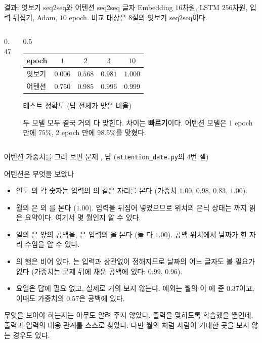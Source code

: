 \documentclass[aspectratio=169,11pt]{beamer}
\begin{document}
\begin{frame}{결과: 엿보기 seq2seq와 어텐션 seq2seq}
글자 Embedding $16$차원, LSTM $256$차원, 입력 뒤집기, Adam, $10$ epoch.
비교 대상은 8절의 엿보기 seq2seq이다.
\vskip1mm
\begin{columns}[c,onlytextwidth]
\begin{column}{0.47\textwidth}
\end{column}
\begin{column}{0.5\textwidth}
\small
\begin{tabular}{@{}lcccc@{}}
\toprule
epoch & $1$ & $2$ & $3$ & $10$ \\
\midrule
엿보기 & $0.006$ & $0.568$ & $0.981$ & $1.000$ \\
어텐션 & $0.750$ & $0.985$ & $0.996$ & $0.999$ \\
\bottomrule
\end{tabular}
\vskip1mm
{\footnotesize 테스트 정확도 (답 전체가 맞은 비율)\par}
\vskip3mm
두 모델 모두 결국 거의 다 맞힌다. 차이는 \textbf{빠르기}이다.
어텐션 모델은 1 epoch 만에 $75\%$, 2 epoch 만에 $98.5\%$를 맞혔다.
\end{column}
\end{columns}
\end{frame}

\begin{frame}{어텐션 가중치를 그려 보면}
문제 , 답  (\texttt{attention\_date.py}의 4번 셀)
\end{frame}

\begin{frame}{어텐션은 무엇을 보았나}
\small
\begin{itemize}
\item 연도 의 각 숫자는 입력의 의 같은 자리를 본다
  (가중치 $1.00$, $0.98$, $0.83$, $1.00$).
\item 월의 은 의 를 본다 ($1.00$).
  입력을 뒤집어 넣었으므로  위치의 은닉 상태는 까지 읽은 요약이다.
  여기서 몇 월인지 알 수 있다.
\item 일의 은  앞의 공백을, 은 입력의 을 본다 (둘 다 $1.00$).
  공백 위치에서 날짜가 한 자리 수임을 알 수 있다.
\item \w{-}의 행은 비어 있다. \w{-}는 입력과 상관없이 정해지므로 날짜의 어느 글자도
  볼 필요가 없다 (가중치는 문제 뒤에 채운 공백에 있다: $0.99$, $0.96$).
\item 요일은 답에 필요 없고, 실제로 거의 보지 않는다.
  예외는 월의 이 에 준 $0.37$이고, 이때도 가중치의 $0.57$은 공백에 있다.
\end{itemize}
\begin{keybox}
무엇을 보아야 하는지는 아무도 알려 주지 않았다.
출력을 맞히도록 학습했을 뿐인데, 출력과 입력의 대응 관계를 스스로 찾았다.
다만 월의 처럼 사람이 기대한 곳을 보지 않는 경우도 있다.
\end{keybox}
\end{frame}
\end{document}
